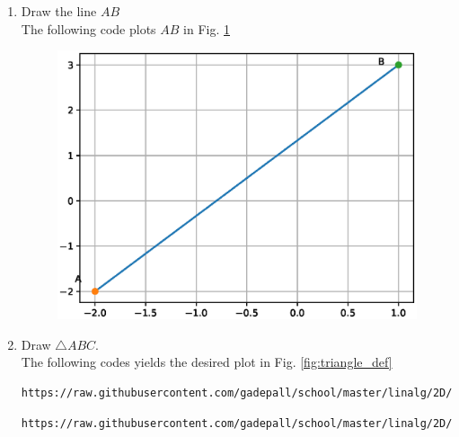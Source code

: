 \documentclass[journal,12pt,twocolumn]{IEEEtran}
\renewcommand\thesection{\arabic{section}}
\begin{document}
\begin{enumerate}[label=\thesection.\arabic*
,ref=\thesection.\theenumi]
\begin{align}
\label{eq:line_dir}
\quad \vec{x} &= \vec{A}+ \lambda \brak{\vec{B}-\vec{A}}
\\
&= -\myvec{2\\2}+ \lambda\myvec{3\\5}
\end{align}
%
\item Draw the line $AB$
\\
\solution The following code plots $AB$ in Fig. \ref{fig:draw_line}

%
\begin{figure}
\centering
\includegraphics[width=\columnwidth]{./figs/draw_line.eps}
\caption{}
\label{fig:draw_line}
\end{figure}

\item Draw $\triangle ABC$.
\\
\solution
The following codes yields the desired plot in Fig. \ref{fig:triangle_def}
\begin{lstlisting}
https://raw.githubusercontent.com/gadepall/school/master/linalg/2D/python_2d/codes/coeffs.py
\end{lstlisting}
\begin{lstlisting}
https://raw.githubusercontent.com/gadepall/school/master/linalg/2D/python_2d/codes/draw_triangle.py
\end{lstlisting}

%


\end{enumerate}
\end{document}

